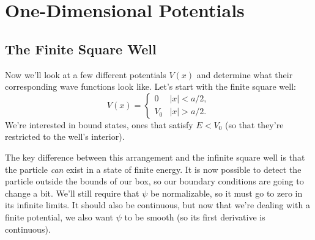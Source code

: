 \documentclass[../p052main.tex]{subfiles}
\begin{document}
\chapter{One-Dimensional Potentials}
\section{The Finite Square Well}
Now we'll look at a few different potentials $V(x)$ and determine what their corresponding wave functions look like.
Let's start with the finite square well:
\[ V(x) = \begin{cases} 0 & |x| < a/2, \\ V_0 & |x| > a/2. \end{cases} \]
We're interested in bound states, ones that satisfy $E < V_0$ (so that they're restricted to the well's interior).

The key difference between this arrangement and the infinite square well is that the particle \textit{can} exist in a state of finite energy.
It is now possible to detect the particle outside the bounds of our box, so our boundary conditions are going to change a bit.
We'll still require that $\psi$ be normalizable, so it must go to zero in its infinite limits.
It should also be continuous, but now that we're dealing with a finite potential, we also want $\psi$ to be smooth (so its first derivative is continuous).
\end{document}
